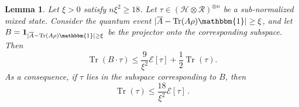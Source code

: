 \documentclass[10pt]{article}
\DeclarePairedDelimiter{\ket}{\lvert}{\rangle}%
\DeclarePairedDelimiter\norm{\lVert}{\rVert}
\newcommand{\energy}{\mathcal{E}}
\newcommand{\calH}{\mathcal{H}}
\newcommand{\calR}{\mathcal{R}}
\DeclareMathOperator{\Tr}{Tr}
\newcommand{\Id}{\mathbbm{1}}
\newtheorem{lemma}[theorem]{Lemma}
\newcommand{\lift}[1]{\overline{#1}}
\begin{document}


\begin{lemma}\label{lem:secondmoment}
    Let $\xi > 0$ satisfy $n \xi^2 \geq 18$.
    Let $\tau \in (\calH \otimes \calR)^{\otimes n}$ be a sub-normalized mixed state.
    Consider the quantum event $|\lift{A} - \Tr(A\rho)\Id| \ge \xi$, and let $B = \mathbf{1}_{|\lift{A} - \Tr(A\rho)\Id|\ge \xi}$ be the projector onto the corresponding subspace.
    Then
    \begin{equation*}
        \Tr(B \cdot \tau)
        \leq \frac{9}{\xi^2} \energy[\tau]
        + \frac{1}{2} \Tr(\tau).
    \end{equation*}
    As a consequence, if $\tau$ lies in the subspace corresponding to $B$, then
    \begin{equation}
        \Tr(\tau) \le \frac{18}{\xi^2} \energy[\tau]\,.
    \end{equation}
\end{lemma}
\end{document}
